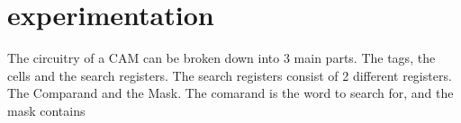 \section{experimentation}
The circuitry of a CAM can be broken down into 3 main parts. The tags, the cells and the search registers. 
The search registers consist of 2 different registers. The Comparand and the Mask. The comarand is the word to search for, and the mask contains